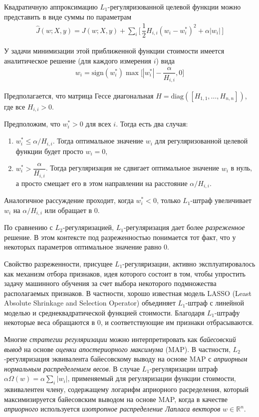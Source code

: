 \documentclass[%
	11pt,
	a4paper,
	utf8,
]{article}
\begin{document}
Квадратичную аппроксимацию $ L_1 $-регуляризованной целевой функции можно представить в виде суммы по параметрам
\begin{align*}
	\hat{J}(w; X, y) = J(w; X, y) + \sum_i \Big[ \, \dfrac{1}{2} H_{i, i} (w_i - w_i^*)^2 + \alpha |w_i| \, \Big]
\end{align*}

У задачи минимизации этой приближенной функции стоимости имеется аналитическое решение (для каждого измерения $ i $) вида
\begin{align*}
	w_i = \text{sign}(w_i^*) \max \Big[ |w_i^*| - \dfrac{\alpha}{H_{i, i}}, 0 \Big]
\end{align*}

Предполагается, что матрица Гессе диагональная $ H = \text{diag}([H_{1, 1}, \ldots, H_{n, n}]) $, где все $ H_{i, i} > 0 $.

Предположим, что $ w_i^* > 0 $ для всех $ i $. Тогда есть два случая:
\begin{enumerate}
	\item $ w_i^* \leqslant \alpha / H_{i, i} $. Тогда оптимальное значение $ w_i $ для регуляризованной целевой функции будет просто $ w_i = 0 $,
	
	\item $ w_i^* > \dfrac{\alpha}{H_{i, i}} $. Тогда регуляризация не сдвигает оптимальное значение $ w_i $ в нуль, а просто смещает его в этом направлении на расстояние $ \alpha / H_{i, i} $. 
\end{enumerate}

Аналогичное рассуждение проходит, когда $ w_i^* < 0 $, только $ L_1 $-штраф увеличивает $ w_i $ на $ \alpha / H_{i, i} $ или обращает в 0.

По сравнению с $ L_2 $-регуляризацией, $ L_1 $-регуляризация дает более \emph{разреженное} решение. В этом контексте под разреженностью понимается тот факт, что у некоторых параметров оптимальное значение равно 0.

Свойство разреженности, присущее $ L_1 $-регуляризации, активно эксплуатировалось как механизм отбора признаков, идея которого состоит в том, чтобы упростить задачу машинного обучения за счет выбора некоторого подмножества располагаемых признаков. В частности, хорошо известная модель LASSO (Least Absolute Shrinkage and Selection Operator) объединяет $ L_1 $-штраф с линейной моделью и среднеквадратической функцией стоимости. Благодаря $ L_1 $-штрафу некоторые веса обращаются в 0, и соответствующие им признаки отбрасываются.

Многие \emph{стратегии регуляризации} можно интерпретировать как \emph{байесовский вывод} на основе \emph{оценки апостериорного максимума} (MAP). В частности, $ L_2 $-регуляризация эквивалента байесовскому выводу на основе MAP с \emph{априорным нормальным распределением весов}. В случае $ L_1 $-регуляризации штраф $ \alpha \Omega(w) = \alpha \sum_i | w_i | $, применяемый для регуляризации функции стоимости, эквивалентен члену, содержащему логарифм априорного расределения, который максимизируется байесовским выводом на основе MAP, когда в качестве \emph{априорного} используется \emph{изотропное распределение Лапласа векторов} $ w \in \mathbb{R}^n $.
\end{document}
